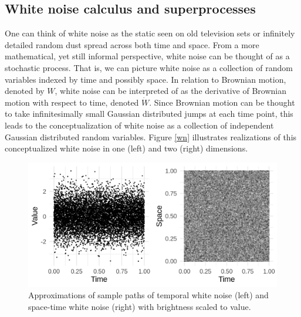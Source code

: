 \documentclass[]{elsarticle} %
\begin{document}
\hypertarget{white-noise-calculus-and-superprocesses}{%
\subsection{\texorpdfstring{White noise calculus and superprocesses
\label{wnc}}{White noise calculus and superprocesses }}\label{white-noise-calculus-and-superprocesses}}

One can think of white noise as the static seen on old television sets
or infinitely detailed random dust spread across both time and space.
From a more mathematical, yet still informal perspective, white noise
can be thought of as a stochastic process. That is, we can picture white
noise as a collection of random variables indexed by time and possibly
space. In relation to Brownian motion, denoted by \(W\), white noise can
be interpreted of as the derivative of Brownian motion with respect to
time, denoted \(\dot W\). Since Brownian motion can be thought to take
infinitesimally small Gaussian distributed jumps at each time point,
this leads to the conceptualization of white noise as a collection of
independent Gaussian distributed random variables. Figure \ref{wn}
illustrates realizations of this conceptualized white noise in one
(left) and two (right) dimensions.

\begin{figure}

{\centering \includegraphics[width=0.8\linewidth]{wn} 

}

\caption{\label{wn}Approximations of sample paths of temporal white noise (left) and space-time white noise (right) with brightness scaled to value.}\label{fig:unnamed-chunk-2}
\end{figure}
\end{document}
